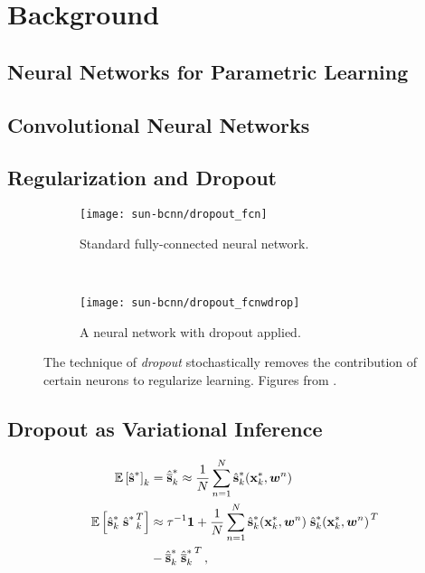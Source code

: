 \section{Background}
\subsection{Neural Networks for Parametric Learning}


\subsection{Convolutional Neural Networks}
\subsection{Regularization and Dropout}

\begin{figure}
\centering
\begin{subfigure}{0.45\textwidth}
	\centering
    \texttt{[image: sun-bcnn/dropout\_fcn]}
    \caption{Standard fully-connected neural network.}
\end{subfigure}
~
\begin{subfigure}{0.45\textwidth}
	\centering
    \texttt{[image: sun-bcnn/dropout\_fcnwdrop]}
    \caption{A neural network with dropout applied.}
\end{subfigure}
\caption{The technique of \textit{dropout} stochastically removes the contribution of certain neurons to regularize learning. Figures	 from \cite{srivastava_dropout_2014}.}
\label{fig:sun-bcnn_dropout}
\end{figure}



\subsection{Dropout as Variational Inference}
\begin{align}
\label{eq:sun_direction_mean}
\mathbb{E}\left[{\hat{\boldsymbol{\mathbf{s}}}}^*\right]_k &= {\hat{\overline{\boldsymbol{\mathbf{s}}}}}^*_k \approx \frac{1}{N} \sum_{n=1}^N {\hat{\boldsymbol{\mathbf{s}}}}^*_k ({\boldsymbol{\mathbf{x}}}^*_k, \boldsymbol{w}^n) \\
\mathbb{E}\left[{\hat{\boldsymbol{\mathbf{s}}}_k}^* \left.{{\hat{\boldsymbol{\mathbf{s}}}}^*}\right.^T_k\right] &\approx \tau^{-1} \boldsymbol{\mathbf{1}} 
 +  \frac{1}{N} \sum_{n=1}^N {\hat{\boldsymbol{\mathbf{s}}}}^*_k({\boldsymbol{\mathbf{x}}}^*_k, \boldsymbol{w}^n) \left.{{\hat{\boldsymbol{\mathbf{s}}}_k}^*({\boldsymbol{\mathbf{x}}}^*_k, \boldsymbol{w}^n)}\right.^T \notag \\ 
 &- {\hat{\overline{\boldsymbol{\mathbf{s}}}}}^*_k \left.{{\hat{\overline{\boldsymbol{\mathbf{s}}}}}^*_k}\right.^T,
 \label{eq:bcnn_covar}
\end{align}




